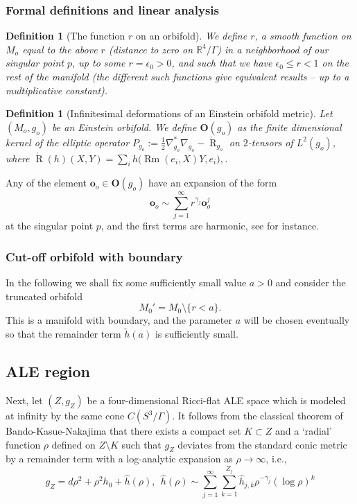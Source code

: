 \documentclass[12pt]{article}
\newtheorem{defn}[thm]{Definition}
\DeclareMathOperator{\Rm}{\operatorname{Rm}}
\DeclareMathOperator{\R}{\operatorname{R}}
\newcommand{\RR}{\mathbb R}
\begin{document}
\subsubsection{Formal definitions and linear analysis}
\begin{defn}[The function $r$ on an orbifold]\label{ro}
We define $r$, a smooth function on $M_o$ equal to the above $r$ (distance to zero on $\RR^4\slash\Gamma$) in a neighborhood of our singular point $p$, up to some $r=\epsilon_0>0$, and such that we have $\epsilon_0\leqslant r<1$ on the rest of the manifold (the different such functions give equivalent results -- up to a multiplicative constant). 
\end{defn}

\begin{defn}[Infinitesimal deformations of an Einstein orbifold metric]
    Let $(M_o,g_o)$ be an Einstein orbifold. We define $\mathbf{O}(g_o)$ as the finite dimensional kernel of the elliptic operator $P_{g_o}:= \frac{1}{2}\nabla^*_{g_o}\nabla_{g_o}- \mathring{\R}_{g_o}$ on $2$-tensors of $L^2(g_o)$, where  $\mathring{\R}(h)(X,Y)= \sum_i h\big(\Rm(e_i,X)Y,e_i\big),$.
\end{defn}

Any of the element $\mathbf{o}_o\in\mathbf{O}(g_o)$ have an expansion of the form
$$\mathbf{o}_o \sim \sum_{j=1}^\infty r^{\gamma_j} \mathbf{o}_o^j$$ at the singular point $p$, and the first terms are harmonic, see \cite{ozu2} for instance.

\subsubsection{Cut-off orbifold with boundary}

In the following we shall fix some sufficiently small value $a > 0$ and consider the truncated orbifold
\begin{equation}
M_0' = M_0 \setminus \{ r < a\}.
\label{truncorb}
\end{equation}
This is a manifold with boundary, and the parameter $a$ will be chosen eventually so that the remainder term
$\tilde{h}(a)$ is sufficiently small.

\subsection{ALE region}

Next, let $(Z, g_Z)$ be a four-dimensional Ricci-flat ALE space which is modeled at infinity by the same cone
$C(S^3/\Gamma)$.  It follows from the classical theorem of Bando-Kasue-Nakajima \cite{BKN} that there
exists a compact set $K \subset Z$ and a `radial' function $\rho$ defined on $Z \setminus K$ such that
$g_Z$ deviates from the standard conic metric by a remainder term with a log-analytic expansion as $\rho \to \infty$, i.e., 
\begin{equation}
g_Z = d\rho^2 + \rho^2 h_0 + \hat{h}(\rho), \ \ \hat{h}(\rho) \sim \sum_{j=1}^\infty\sum_{k=1}^{Z_j} \hat{h}_{j,k} \rho^{-\gamma_j} (\log \rho)^k
\label{gZ}
\end{equation}
\end{document}
